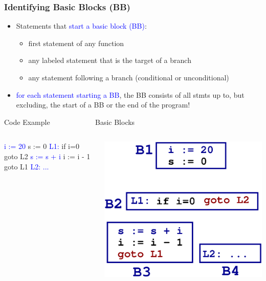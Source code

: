 \documentclass{beamer}
\newcommand{\blue}[1]{\textcolor{Blue}{{#1}}}
\newcommand{\emp}[1]{\textcolor{DikuRed}{ #1}}
\begin{document}
\begin{frame}[fragile,t]
    \frametitle{Identifying Basic Blocks (BB)}

\begin{itemize}
\item Statements that \blue{start a basic block (BB)}:
    \begin{itemize}
        \item first statement of any function

        \item any labeled statement that is the target of a branch

        \item any statement following a branch (conditional or unconditional)\smallskip
    \end{itemize}

\item \blue{for each statement starting a BB}, the BB consists of all stmts up
            to, but excluding, the start of a BB or the end of the program!
\end{itemize}

\begin{block}{Code Example $\mbox{~~~~~~~~~~~~~~~~~}$ Basic Blocks}
\begin{columns}
\begin{colorcode}[fontsize=\scriptsize]
    \blue{i := 20}
    s := 0
\blue{L1:} if i=0 \emp{goto L2}
    \blue{s := s + i}
    i := i - 1
    \emp{goto L1}
\blue{L2: ... }
\end{colorcode} 
\includegraphics[width=20ex]{Figures/CFGbb}
\end{columns}
\end{block}

\end{frame}
\end{document}
